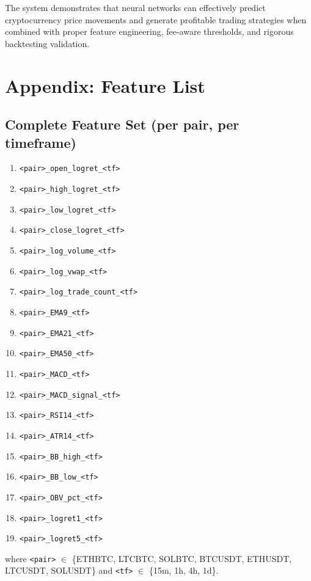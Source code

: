 \documentclass[12pt,a4paper]{article}
\begin{document}
The system demonstrates that neural networks can effectively predict cryptocurrency price movements and generate profitable trading strategies when combined with proper feature engineering, fee-aware thresholds, and rigorous backtesting validation.

\section{Appendix: Feature List}

\subsection{Complete Feature Set (per pair, per timeframe)}
\begin{enumerate}
    \item \texttt{<pair>\_open\_logret\_<tf>}
    \item \texttt{<pair>\_high\_logret\_<tf>}
    \item \texttt{<pair>\_low\_logret\_<tf>}
    \item \texttt{<pair>\_close\_logret\_<tf>}
    \item \texttt{<pair>\_log\_volume\_<tf>}
    \item \texttt{<pair>\_log\_vwap\_<tf>}
    \item \texttt{<pair>\_log\_trade\_count\_<tf>}
    \item \texttt{<pair>\_EMA9\_<tf>}
    \item \texttt{<pair>\_EMA21\_<tf>}
    \item \texttt{<pair>\_EMA50\_<tf>}
    \item \texttt{<pair>\_MACD\_<tf>}
    \item \texttt{<pair>\_MACD\_signal\_<tf>}
    \item \texttt{<pair>\_RSI14\_<tf>}
    \item \texttt{<pair>\_ATR14\_<tf>}
    \item \texttt{<pair>\_BB\_high\_<tf>}
    \item \texttt{<pair>\_BB\_low\_<tf>}
    \item \texttt{<pair>\_OBV\_pct\_<tf>}
    \item \texttt{<pair>\_logret1\_<tf>}
    \item \texttt{<pair>\_logret5\_<tf>}
\end{enumerate}

where \texttt{<pair>} $\in$ \{ETHBTC, LTCBTC, SOLBTC, BTCUSDT, ETHUSDT, LTCUSDT, SOLUSDT\} and \texttt{<tf>} $\in$ \{15m, 1h, 4h, 1d\}.
\end{document}
